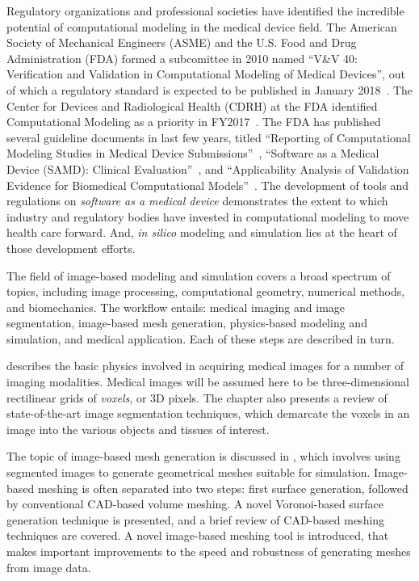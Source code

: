 
Regulatory organizations and professional societies have identified the incredible potential of computational modeling in the medical device field. The American Society of Mechanical Engineers (ASME) and the U.S. Food and Drug Administration (FDA) formed a subcomittee in 2010 named ``V\&V 40: Verification and Validation in Computational Modeling of Medical Devices'', out of which a regulatory standard is expected to be published in January 2018~\cite{committee}. The Center for Devices and Radiological Health (CDRH) at the FDA identified Computational Modeling as a priority in FY2017~\cite{Morrison2017}. The FDA has published several guideline documents in last few years, titled ``Reporting of Computational Modeling Studies in Medical Device Submissions''~\cite{fda1_2016}, ``Software as a Medical Device (SAMD): Clinical Evaluation''~\cite{fda1_2016}, and ``Applicability Analysis of Validation Evidence for Biomedical Computational Models''~\cite{pathmanathan_2017}. The development of tools and regulations on \textit{software as a medical device} demonstrates the extent to which industry and regulatory bodies have invested in computational modeling to move health care forward. And, \textit{in silico} modeling and simulation lies at the heart of those development efforts.


The field of image-based modeling and simulation covers a broad spectrum of topics, including image processing, computational geometry, numerical methods, and biomechanics. The workflow entails: medical imaging and image segmentation, image-based mesh generation, physics-based modeling and simulation, and medical application. Each of these steps are described in turn.

 describes the basic physics involved in acquiring medical images for a number of imaging modalities. Medical images will be assumed here to be three-dimensional rectilinear grids of \textit{voxels}, or 3D pixels. The chapter also presents a review of state-of-the-art image segmentation techniques, which demarcate the voxels in an image into the various objects and tissues of interest.

The topic of image-based mesh generation is discussed in , which involves using segmented images to generate  geometrical meshes suitable for simulation. Image-based meshing is often separated into two steps: first surface generation,  followed by conventional CAD-based volume meshing. A novel Voronoi-based surface generation technique is presented, and a brief review of CAD-based meshing techniques are covered. A novel image-based meshing tool is introduced, that makes important improvements to the speed and robustness of generating meshes from image data.

